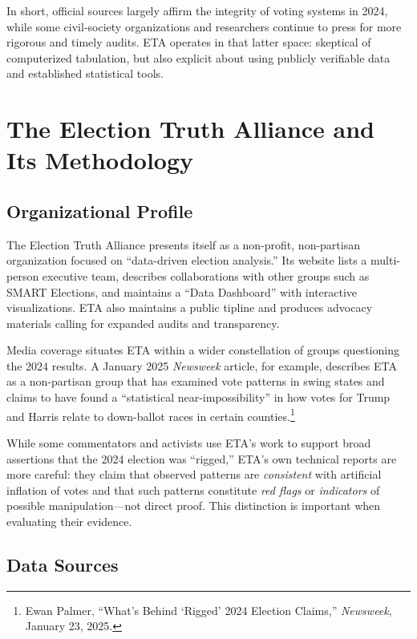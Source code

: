 \documentclass[12pt]{article}
\begin{document}
In short, official sources largely affirm the integrity of voting systems in 2024, while some civil-society organizations and researchers continue to press for more rigorous and timely audits. ETA operates in that latter space: skeptical of computerized tabulation, but also explicit about using publicly verifiable data and established statistical tools.

\section{The Election Truth Alliance and Its Methodology}

\subsection{Organizational Profile}

The Election Truth Alliance presents itself as a non-profit, non-partisan organization focused on \enquote{data-driven election analysis.} Its website lists a multi-person executive team, describes collaborations with other groups such as SMART Elections, and maintains a ``Data Dashboard'' with interactive visualizations. ETA also maintains a public tipline and produces advocacy materials calling for expanded audits and transparency.

Media coverage situates ETA within a wider constellation of groups questioning the 2024 results. A January 2025 \emph{Newsweek} article, for example, describes ETA as a non-partisan group that has examined vote patterns in swing states and claims to have found a \enquote{statistical near-impossibility} in how votes for Trump and Harris relate to down-ballot races in certain counties.\footnote{Ewan Palmer, ``What's Behind `Rigged' 2024 Election Claims,'' \emph{Newsweek}, January 23, 2025.}

While some commentators and activists use ETA's work to support broad assertions that the 2024 election was ``rigged,'' ETA's own technical reports are more careful: they claim that observed patterns are \emph{consistent} with artificial inflation of votes and that such patterns constitute \emph{red flags} or \emph{indicators} of possible manipulation---not direct proof. This distinction is important when evaluating their evidence.

\subsection{Data Sources}
\end{document}
